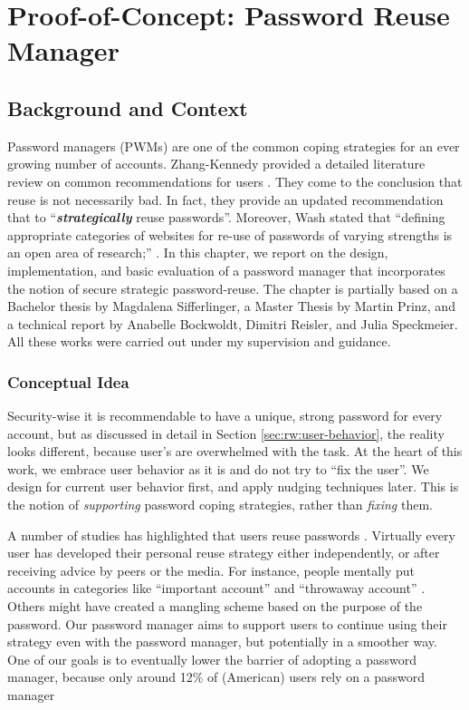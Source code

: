 \chapter[Proof-of-Concept: Password Reuse Manager]{Proof-of-Concept: Password Reuse Manager}\label{chap:pwrm}

\section{Background and Context}
Password managers (PWMs) are one of the common coping strategies for an ever growing number of accounts. 
Zhang-Kennedy \etal provided a detailed literature review on common recommendations for users \cite{ZhangKennedy2016RevisitingPasswordRules}. They come to the conclusion that reuse is not necessarily bad. In fact, they provide an updated recommendation that to ``\textit{\textbf{strategically}} reuse passwords''. Moreover, Wash \etal stated that ``defining appropriate categories of websites for re-use of passwords of varying strengths is an open area of research;'' \cite{Wash2016UnderstandingPasswordChoices}. In this chapter, we report on the design, implementation, and basic evaluation of a password manager that incorporates the notion of secure strategic password-reuse. The chapter is partially based on a Bachelor thesis by Magdalena Sifferlinger, a Master Thesis by Martin Prinz, and a technical report by Anabelle Bockwoldt, Dimitri Reisler, and Julia Speckmeier. All these works were carried out under my supervision and guidance. \ar

\subsection{Conceptual Idea}
Security-wise it is recommendable to have a unique, strong password for every account, but as discussed in detail in Section \ref{sec:rw:user-behavior}, the reality looks different, because user's are overwhelmed with the task. At the heart of this work, we embrace user behavior as it is and do not try to ``fix the user''. We design for current user behavior first, and apply nudging techniques later. This is the notion of \textit{supporting} password coping strategies, rather than \textit{fixing} them. 


A number of studies has highlighted that users reuse passwords \ar. Virtually every user has developed their personal reuse strategy either independently, or after receiving advice by peers or the media. For instance, people mentally put accounts in categories  like ``important account'' and ``throwaway account'' \cite{Egelman2013DoesMyPasswordGoUpToEleven}. Others might have created a mangling scheme based on the purpose of the password. Our password manager aims to support users to continue using their strategy even with the password manager, but potentially in a smoother way. One of our goals is to eventually lower the barrier of adopting a password manager, because only around 12\% of (American) users rely on a password manager


